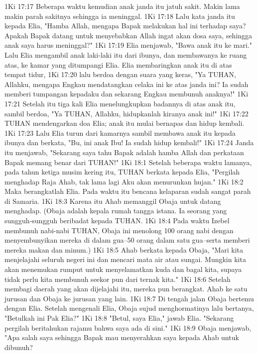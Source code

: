 1Ki 17:17  Beberapa waktu kemudian anak janda itu jatuh sakit. Makin lama makin parah sakitnya sehingga ia meninggal.
1Ki 17:18  Lalu kata janda itu kepada Elia, "Hamba Allah, mengapa Bapak melakukan hal ini terhadap saya? Apakah Bapak datang untuk menyebabkan Allah ingat akan dosa saya, sehingga anak saya harus meninggal?"
1Ki 17:19  Elia menjawab, "Bawa anak itu ke mari." Lalu Elia mengambil anak laki-laki itu dari ibunya, dan membawanya ke ruang atas, ke kamar yang ditumpangi Elia. Elia membaringkan anak itu di atas tempat tidur,
1Ki 17:20  lalu berdoa dengan suara yang keras, "Ya TUHAN, Allahku, mengapa Engkau mendatangkan celaka ini ke atas janda ini? Ia sudah memberi tumpangan kepadaku dan sekarang Engkau membunuh anaknya!"
1Ki 17:21  Setelah itu tiga kali Elia menelungkupkan badannya di atas anak itu, sambil berdoa, "Ya TUHAN, Allahku, hidupkanlah kiranya anak ini!"
1Ki 17:22  TUHAN mendengarkan doa Elia; anak itu mulai bernapas dan hidup kembali.
1Ki 17:23  Lalu Elia turun dari kamarnya sambil membawa anak itu kepada ibunya dan berkata, "Bu, ini anak Ibu! Ia sudah hidup kembali!"
1Ki 17:24  Janda itu menjawab, "Sekarang saya tahu Bapak adalah hamba Allah dan perkataan Bapak memang benar dari TUHAN!"
1Ki 18:1  Setelah beberapa waktu lamanya, pada tahun ketiga musim kering itu, TUHAN berkata kepada Elia, "Pergilah menghadap Raja Ahab, tak lama lagi Aku akan menurunkan hujan."
1Ki 18:2  Maka berangkatlah Elia. Pada waktu itu bencana kelaparan sudah sangat parah di Samaria.
1Ki 18:3  Karena itu Ahab memanggil Obaja untuk datang menghadap. (Obaja adalah kepala rumah tangga istana. Ia seorang yang sungguh-sungguh beribadat kepada TUHAN.
1Ki 18:4  Pada waktu Izebel membunuh nabi-nabi TUHAN, Obaja ini menolong 100 orang nabi dengan menyembunyikan mereka di dalam gua--50 orang dalam satu gua--serta memberi mereka makan dan minum.)
1Ki 18:5  Ahab berkata kepada Obaja, "Mari kita menjelajahi seluruh negeri ini dan mencari mata air atau sungai. Mungkin kita akan menemukan rumput untuk menyelamatkan kuda dan bagal kita, supaya tidak perlu kita membunuh seekor pun dari ternak kita."
1Ki 18:6  Setelah membagi daerah yang akan dijelajahi itu, mereka pun berangkat. Ahab ke satu jurusan dan Obaja ke jurusan yang lain.
1Ki 18:7  Di tengah jalan Obaja bertemu dengan Elia. Setelah mengenali Elia, Obaja sujud menghormatinya lalu bertanya, "Betulkah ini Pak Elia?"
1Ki 18:8  "Betul, saya Elia," jawab Elia. "Sekarang pergilah beritahukan rajamu bahwa saya ada di sini."
1Ki 18:9  Obaja menjawab, "Apa salah saya sehingga Bapak mau menyerahkan saya kepada Ahab untuk dibunuh?
